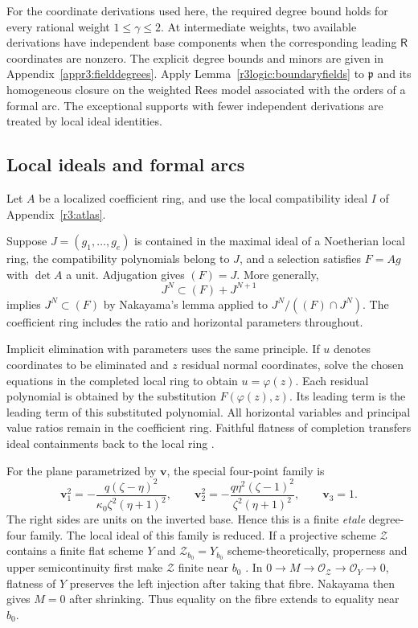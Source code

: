 \documentclass[11pt,a4paper]{article}
\numberwithin{equation}{section}
\theoremstyle{plain}
\theoremstyle{definition}
\theoremstyle{remark}
\begin{document}
For the coordinate derivations used here, the required degree bound
holds for every rational weight $1\le\gamma\le2$. At intermediate
weights, two available derivations have independent base components
when the corresponding leading $\mathsf R$ coordinates are nonzero. The
explicit degree bounds and minors are given in
Appendix~\ref{appr3:fielddegrees}. Apply Lemma~\ref{r3logic:boundaryfields}
to $\mathfrak p$ and its homogeneous closure on the weighted Rees model
associated with the orders of a formal arc. The exceptional supports
with fewer independent derivations are treated by local ideal identities.

\subsection{Local ideals and formal arcs}
\label{appr3:boundarylogic}

Let $A$ be a localized coefficient ring, and use the local compatibility
ideal $I$ of Appendix~\ref{r3:atlas}.

Suppose $J=(g_1,\ldots,g_e)$ is contained in the maximal ideal of a
Noetherian local ring, the compatibility polynomials belong to $J$, and a selection
satisfies $F=Ag$ with $\det A$ a unit. Adjugation gives $(F)=J$.
More generally,
\[
 J^N\subset(F)+J^{N+1}
\]
implies $J^N\subset(F)$ by Nakayama's lemma applied to
$J^N/((F)\cap J^N)$. The coefficient ring includes the ratio and
horizontal parameters throughout.

Implicit elimination with parameters uses the same principle.
If $u$ denotes coordinates to be eliminated and $z$ residual normal coordinates,
solve the chosen equations in the completed local ring to obtain
$u=\varphi(z)$. Each residual polynomial is obtained by the substitution
$F(\varphi(z),z)$. Its leading term is the leading term of this substituted polynomial. All horizontal
variables and principal value ratios remain in the coefficient ring. Faithful flatness of completion transfers ideal
containments back to the local ring \cite[Lemma~10.97.3, Tag~00MC]{StacksProject}.

For the plane parametrized by $\boldsymbol v$, the special four-point family is
\[
 \boldsymbol v_1^2=-\frac{q(\zeta -\eta )^2}{\kappa_0 \zeta ^2(\eta +1)^2},\qquad
 \boldsymbol v_2^2=-\frac{q\eta ^2(\zeta -1)^2}{\zeta ^2(\eta +1)^2},\qquad \boldsymbol v_3=1.
\]
The right sides are units on the inverted base. Hence this is a
finite \emph{etale} degree-four family. The local ideal of this family is reduced.
If a projective scheme $\mathscr Z$ contains a finite flat scheme $Y$ and
$\mathscr Z_{b_0}=Y_{b_0}$ scheme-theoretically, properness and upper
semicontinuity first make $\mathscr Z$ finite near $b_0$
\cite[Lemma~37.44.2, Tag~02UP]{StacksProject}. In
$0\to M\to\mathcal O_{\mathscr Z} \to\mathcal O_Y\to0$, flatness of $Y$
preserves the left injection after taking that fibre. Nakayama then
gives $M=0$ after shrinking. Thus equality on the fibre extends to equality near $b_0$.
\end{document}

